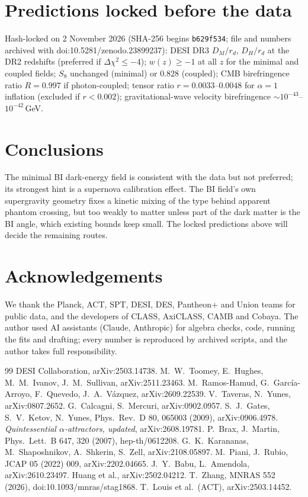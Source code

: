 \documentclass[11pt]{article}
\begin{document}
\section{Predictions locked before the data}
Hash-locked on 2 November 2026 (SHA-256 begins \texttt{b629f534}; file and numbers archived with
doi:10.5281/zenodo.23899237): DESI DR3 $D_M/r_d$, $D_H/r_d$ at the DR2 redshifts (preferred if $\Delta\chi^2\le-4$);
$w(z)\ge-1$ at all $z$ for the minimal and coupled fields; $S_8$ unchanged (minimal) or 0.828 (coupled); CMB
birefringence ratio $R=0.997$ if photon-coupled; tensor ratio $r=0.0033$--$0.0048$ for $\alpha=1$ inflation
(excluded if $r<0.002$); gravitational-wave velocity birefringence $\sim10^{-43}$--$10^{-42}$\,GeV.

\section{Conclusions}
The minimal BI dark-energy field is consistent with the data but not preferred; its strongest hint is a supernova
calibration effect. The BI field's own supergravity geometry fixes a kinetic mixing of the type behind apparent phantom
crossing, but too weakly to matter unless part of the dark matter is the BI angle, which existing bounds keep small.
The locked predictions above will decide the remaining routes.

\section*{Acknowledgements}
We thank the Planck, ACT, SPT, DESI, DES, Pantheon+ and Union teams for public data, and the developers of CLASS,
AxiCLASS, CAMB and Cobaya. The author used AI assistants (Claude, Anthropic) for algebra checks, code, running the fits
and drafting; every number is reproduced by archived scripts, and the author takes full responsibility.

\begin{thebibliography}{99}
 DESI Collaboration, arXiv:2503.14738.
 M.~W.~Toomey, E.~Hughes, M.~M.~Ivanov, J.~M.~Sullivan, arXiv:2511.23463.
 M.~Ramos-Hamud, G.~Garc\'ia-Arroyo, F.~Quevedo, J.~A.~V\'azquez, arXiv:2609.22539.
 V.~Taveras, N.~Yunes, arXiv:0807.2652.
 G.~Calcagni, S.~Mercuri, arXiv:0902.0957.
 S.~J.~Gates, S.~V.~Ketov, N.~Yunes, Phys.\ Rev.\ D 80, 065003 (2009), arXiv:0906.4978.
 \emph{Quintessential $\alpha$-attractors, updated}, arXiv:2608.19781.
 P.~Brax, J.~Martin, Phys.\ Lett.\ B 647, 320 (2007), hep-th/0612208.
 G.~K.~Karananas, M.~Shaposhnikov, A.~Shkerin, S.~Zell, arXiv:2108.05897.
 M.~Piani, J.~Rubio, JCAP 05 (2022) 009, arXiv:2202.04665.
 J.~Y.~Babu, L.~Amendola, arXiv:2610.23497.
 Huang et al., arXiv:2502.04212.
 T.~Zhang, MNRAS 552 (2026), doi:10.1093/mnras/stag1868.
 T.~Louis et al.\ (ACT), arXiv:2503.14452.
\end{thebibliography}
\end{document}
